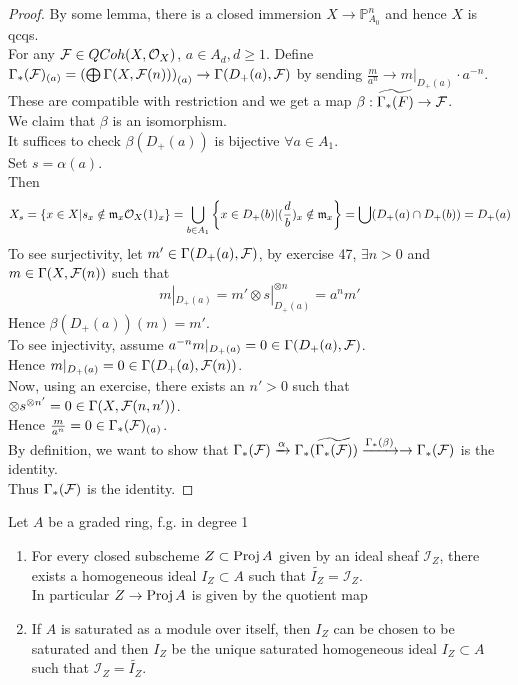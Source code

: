 \documentclass[../main.tex]{subfiles}
\begin{document}
\begin{proof}
By some lemma, there is a closed immersion $X\to \mathbb{P}^{n}_{A_0} $ and hence $X$ is qcqs.\\
For any $\mathcal{F}\in QCoh( X,\mathcal{O}_X) $, $a\in A_d, d \geq 1$. Define $\Gamma_\ast( \mathcal{F})_{( a) } = \left( \bigoplus \Gamma( X,\mathcal{F}( n) ) \right)_{( a) } \to \Gamma( D_+( a) ,\mathcal{F}) $ by sending $ \frac{m}{a^{n}}\to m|_{D_+( a) } \cdot a^{-n}$.\\
These are compatible with restriction and we get a map $\beta: \widetilde{\Gamma_\ast( F) } \to \mathcal{F}$.\\
We claim that $\beta$ is an isomorphism.\\
It suffices to check $\beta( D_+( a) ) $ is bijective $\forall a \in A_1$.\\
Set $s= \alpha( a) $.\\
Then
\[ 
X_s = \left\{ x\in X| s_x \notin \mathfrak{m}_x\mathcal{O}_X( 1)_x \right\} = \bigcup_{b \in A_1} \left\{ x\in D_+( b) | ( \frac{d}{b})_x \notin \mathfrak{m}_x \right\} = \bigcup ( D_+( a) \cap D_+( b) ) = D_+(a) 
\]
To see surjectivity, let $m' \in \Gamma( D_+( a) ,\mathcal{F}) $, by exercise 47, $\exists n>0$ and $m \in \Gamma( X,\mathcal{F}( n) ) $ such that
\[ 
m|_{D_+( a) } = m' \otimes s|_{D_+( a) }^{\otimes n}= a^{n}m'
\]
Hence $\beta( D_+( a) ) ( m) = m'$.\\
To see injectivity, assume $a^{-n}m |_{D_+( a) } =0 \in \Gamma( D_+( a) ,\mathcal{F}) $.\\
Hence $m|_{D_+( a) } =0\in \Gamma( D_+( a) ,\mathcal{F}( n) ) $.\\
Now, using an exercise, there exists an $n'>0$ such that $\otimes s^{\otimes n'}=0 \in \Gamma( X,\mathcal{F}( n,n') ) $.\\
Hence $\frac{m}{a^{n}}=0 \in \Gamma_\ast( \mathcal{F})_{( a) } $.\\

By definition, we want to show that $\Gamma_\ast( \mathcal{F}) \xrightarrow{\alpha} \Gamma_\ast( \widetilde{\Gamma_\ast( \mathcal{F}) }) \xrightarrow{\Gamma_\ast( \beta) } \to \Gamma_\ast( \mathcal{F}) $ is the identity.\\
Thus $\Gamma_\ast( \mathcal{F}) $ is the identity.
\end{proof}
\begin{crly}
Let $A$ be a graded ring, f.g. in degree 1
\begin{enumerate}
	\item For every closed subscheme $Z \subset \operatorname{Proj} A$ given by an ideal sheaf $\mathcal{I}_Z$, there exists a homogeneous ideal $I_Z \subset A$ such that $ \widetilde{I_Z} = \mathcal{I}_Z$.\\
		In particular $Z \to \operatorname{Proj} A$ is given by the quotient map
	\item If $A$ is saturated as a module over itself, then $I_Z$ can be chosen to be saturated and then $I_Z$ be the unique saturated homogeneous ideal $I_Z \subset A$ such that $ \mathcal{I}_Z = \widetilde{I_Z}$.
\end{enumerate}
\end{crly}
\end{document}
